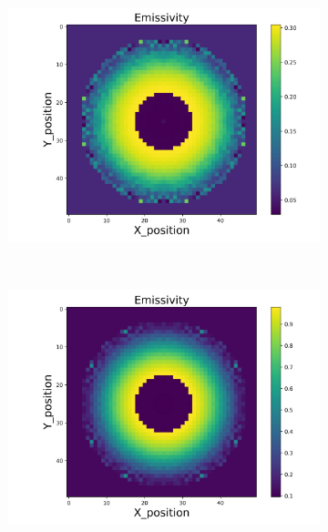 \begin{figure}[p]
\begin{minipage}{\textwidth}
        \begin{subfigure}{0.325\textwidth}
            \centering
            \includegraphics[width=\textwidth]{figures/raw_data/21/mix/emi_cal.jpg}
        \end{subfigure}
    \end{minipage}\\
    \begin{minipage}{\textwidth}
        \centering
        \begin{subfigure}{0.325\textwidth}
            \centering
            \includegraphics[width=\textwidth]{figures/raw_data/22/mix/emi_cal.jpg}
        \end{subfigure}

\end{minipage}
\end{figure}
